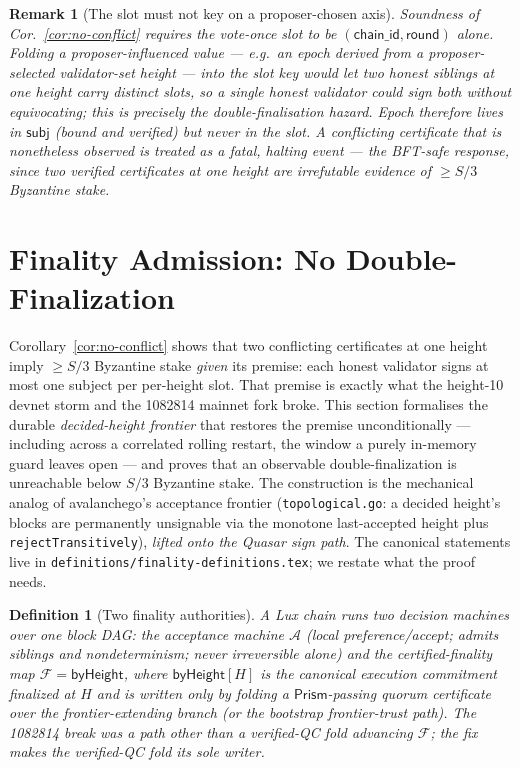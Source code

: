 \documentclass[11pt]{article}
\newtheorem{definition}{Definition}
\newtheorem{remark}{Remark}
\begin{document}
\begin{remark}[The slot must not key on a proposer-chosen axis]
\label{rem:epoch-blind-slot}
Soundness of Cor.~\ref{cor:no-conflict} requires the vote-once slot to
be $(\mathsf{chain\_id}, \mathsf{round})$ alone.  Folding a
proposer-influenced value --- e.g.\ an epoch derived from a
proposer-selected validator-set height --- \emph{into} the slot key
would let two honest siblings at one height carry distinct slots, so a
single honest validator could sign both without equivocating; this is
precisely the double-finalisation hazard.  Epoch therefore lives in
$\mathsf{subj}$ (bound and verified) but never in the slot.  A
conflicting certificate that is nonetheless observed is treated as a
fatal, halting event --- the BFT-safe response, since two verified
certificates at one height are irrefutable evidence of $\geq S/3$
Byzantine stake.
\end{remark}

\section{Finality Admission: No Double-Finalization}
\label{sec:nodoublefinal}

Corollary~\ref{cor:no-conflict} shows that two conflicting certificates
at one height imply $\geq S/3$ Byzantine stake \emph{given} its premise:
each honest validator signs at most one subject per per-height slot.
That premise is exactly what the height-10 devnet storm and the
1082814 mainnet fork broke. This section formalises the durable
\emph{decided-height frontier} that restores the premise
unconditionally --- including across a correlated rolling restart, the
window a purely in-memory guard leaves open --- and proves that an
observable double-finalization is unreachable below $S/3$ Byzantine
stake. The construction is the mechanical analog of avalanchego's
acceptance frontier (\texttt{topological.go}: a decided height's blocks
are permanently unsignable via the monotone last-accepted height plus
\texttt{rejectTransitively}), \emph{lifted onto the Quasar sign path}.
The canonical statements live in
\texttt{definitions/finality-definitions.tex}; we restate what the
proof needs.

\begin{definition}[Two finality authorities]
\label{def:nf-authorities}
A Lux chain runs two decision machines over one block DAG: the
\emph{acceptance} machine $\mathcal{A}$ (local preference/accept; admits
siblings and nondeterminism; never irreversible alone) and the
\emph{certified-finality} map $\mathcal{F} = \mathsf{byHeight}$, where
$\mathsf{byHeight}[H]$ is the canonical execution commitment finalized
at $H$ and is written \emph{only} by folding a $\mathsf{Prism}$-passing
quorum certificate over the frontier-extending branch (or the bootstrap
frontier-trust path). The 1082814 break was a path other than a
verified-QC fold advancing $\mathcal{F}$; the fix makes the verified-QC
fold its sole writer.
\end{definition}
\end{document}
